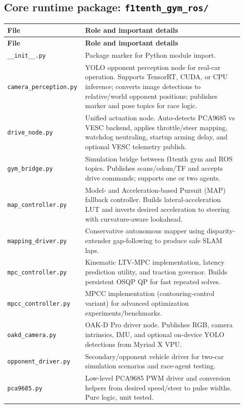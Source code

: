 \documentclass[11pt]{article}
\begin{document}
\subsection{Core runtime package: \texttt{f1tenth\_gym\_ros/}}
\begin{longtable}{p{0.30\linewidth}p{0.66\linewidth}}
\toprule
\textbf{File} & \textbf{Role and important details} \\
\midrule
\endfirsthead
\toprule
\textbf{File} & \textbf{Role and important details} \\
\midrule
\endhead
\texttt{\_\_init\_\_.py} & Package marker for Python module import. \\
\texttt{camera\_perception.py} & YOLO opponent perception node for real-car operation. Supports TensorRT, CUDA, or CPU inference; converts image detections to relative/world opponent positions; publishes marker and pose topics for race logic. \\
\texttt{drive\_node.py} & Unified actuation node. Auto-detects PCA9685 vs VESC backend, applies throttle/steer mapping, watchdog neutraling, startup arming delay, and optional VESC telemetry publish. \\
\texttt{gym\_bridge.py} & Simulation bridge between f1tenth gym and ROS topics. Publishes scans/odom/TF and accepts drive commands; supports one or two agents. \\
\texttt{map\_controller.py} & Model- and Acceleration-based Pursuit (MAP) fallback controller. Builds lateral-acceleration LUT and inverts desired acceleration to steering with curvature-aware lookahead. \\
\texttt{mapping\_driver.py} & Conservative autonomous mapper using disparity-extender gap-following to produce safe SLAM laps. \\
\texttt{mpc\_controller.py} & Kinematic LTV-MPC implementation, latency prediction utility, and traction governor. Builds persistent OSQP QP for fast repeated solves. \\
\texttt{mpcc\_controller.py} & MPCC implementation (contouring-control variant) for advanced optimization experiments/benchmarks. \\
\texttt{oakd\_camera.py} & OAK-D Pro driver node. Publishes RGB, camera intrinsics, IMU, and optional on-device YOLO detections from Myriad X VPU. \\
\texttt{opponent\_driver.py} & Secondary/opponent vehicle driver for two-car simulation scenarios and race-agent testing. \\
\texttt{pca9685.py} & Low-level PCA9685 PWM driver and conversion helpers from desired speed/steer to pulse widths. Pure logic, unit tested. \\

\end{longtable}
\end{document}
